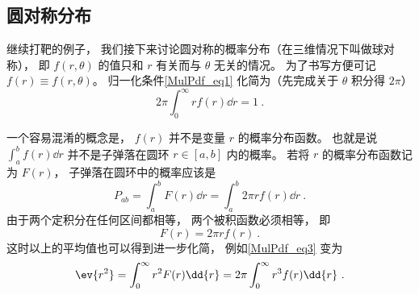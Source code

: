 
\subsection{圆对称分布}
继续打靶的例子， 我们接下来讨论圆对称的概率分布（在三维情况下叫做球对称）， 即 $f(r, \theta)$ 的值只和 $r$ 有关而与 $\theta$ 无关的情况。 为了书写方便可记 $f(r) \equiv f(r, \theta)$。 归一化条件\autoref{MulPdf_eq1} 化简为（先完成关于 $\theta$ 积分得 $2\pi$）
\begin{equation}
2\pi \int_0^\infty r f(r) \dd{r} = 1~.
\end{equation}

一个容易混淆的概念是， $f(r)$ 并不是变量 $r$ 的概率分布函数。 也就是说 $\int_a^b f(r) \dd{r}$ 并不是子弹落在圆环 $r \in [a, b]$ 内的概率。 若将 $r$ 的概率分布函数记为 $F(r)$， 子弹落在圆环中的概率应该是
\begin{equation}\label{MulPdf_eq4}
P_{ab} = \int_a^b F(r) \dd{r} = \int_a^b 2\pi r f(r) \dd{r}~.
\end{equation}
由于两个定积分在任何区间都相等， 两个被积函数必须相等， 即
\begin{equation}\label{MulPdf_eq5}
F(r) = 2\pi r f(r)~.
\end{equation}
这时以上的平均值也可以得到进一步化简， 例如\autoref{MulPdf_eq3} 变为
\begin{equation}
\ev{r^2} = \int_0^\infty r^2 F(r) \dd{r}
= 2\pi \int_0^\infty r^3 f(r) \dd{r}~.
\end{equation}
